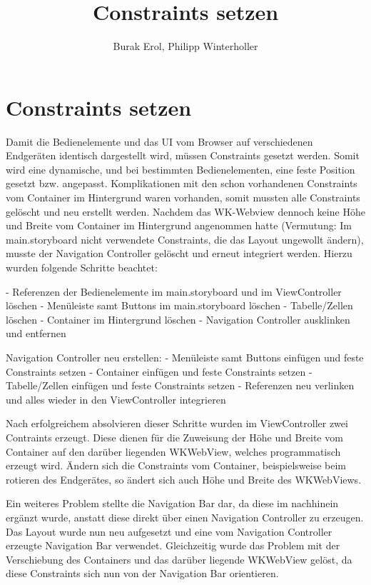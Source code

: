 
\title{Constraints setzen}
\author{Burak Erol, Philipp Winterholler}

\section{Constraints setzen}

Damit die Bedienelemente und das UI vom Browser auf verschiedenen Endgeräten identisch dargestellt wird, müssen Constraints gesetzt werden. Somit wird eine dynamische, und bei bestimmten Bedienelementen, eine feste Position gesetzt bzw. angepasst. Komplikationen mit den schon vorhandenen Constraints vom Container im Hintergrund waren vorhanden, somit mussten alle Constraints gelöscht und neu erstellt werden. Nachdem das WK-Webview dennoch keine Höhe und Breite vom Container im Hintergrund angenommen hatte (Vermutung: Im main.storyboard nicht verwendete Constraints, die das Layout ungewollt ändern), musste der Navigation Controller gelöscht und erneut integriert werden. Hierzu wurden folgende Schritte beachtet:

- Referenzen der Bedienelemente im main.storyboard und im ViewController löschen 
- Menüleiste samt Buttons im main.storyboard löschen 
- Tabelle/Zellen löschen
- Container im Hintergrund löschen
- Navigation Controller ausklinken und entfernen

Navigation Controller neu erstellen:
- Menüleiste samt Buttons einfügen und feste Constraints setzen
- Container einfügen und feste Constraints setzen
- Tabelle/Zellen einfügen und feste Constraints setzen
- Referenzen neu verlinken und alles wieder in den ViewController integrieren

Nach erfolgreichem absolvieren dieser Schritte wurden im ViewController zwei Contraints erzeugt. Diese dienen für die Zuweisung der Höhe und Breite vom Container auf den darüber liegenden WKWebView, welches programmatisch erzeugt wird. Ändern sich die Constraints vom Container, beispielsweise beim rotieren des Endgerätes, so ändert sich auch Höhe und Breite des WKWebViews.

Ein weiteres Problem stellte die Navigation Bar dar, da diese im nachhinein ergänzt wurde, anstatt diese direkt über einen Navigation Controller zu erzeugen. Das Layout wurde nun neu aufgesetzt und eine vom Navigation Controller erzeugte Navigation Bar verwendet. Gleichzeitig wurde das Problem mit der Verschiebung des Containers und das darüber liegende WKWebView gelöst, da diese Constraints sich nun von der Navigation Bar orientieren.

